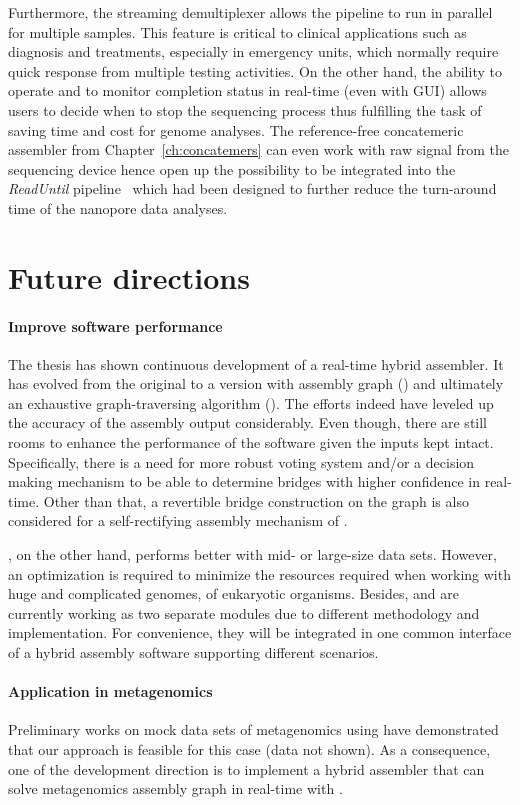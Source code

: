 Furthermore, the streaming demultiplexer \npbarcode{} allows the pipeline to run in parallel for multiple samples.
This feature is critical to clinical applications such as diagnosis and treatments, especially in emergency units, which normally require quick response from multiple testing activities.
On the other hand, the ability to operate and to monitor completion status in real-time (even with GUI) allows users to decide when to stop the sequencing process thus fulfilling the task of saving time and cost for genome analyses.
The reference-free concatemeric assembler from Chapter~\ref{ch:concatemers} can even work with raw signal from the sequencing device hence open up the possibility to be integrated into the \emph{ReadUntil} pipeline~\cite{LooseMS2016} which had been designed to further reduce the turn-around time of the nanopore data analyses.
\section{Future directions}
\paragraph{Improve software performance}
The thesis has shown continuous development of a real-time hybrid assembler. It has evolved from the original \npscarf{} to a version with assembly graph (\npscarfg{}) and ultimately an exhaustive graph-traversing algorithm (\npgraph{}). 
The efforts indeed have leveled up the accuracy of the assembly output considerably.
Even though, there are still rooms to enhance the performance of the software given the inputs kept intact.
Specifically, there is a need for more robust voting system and/or a decision making mechanism to be able to determine bridges with higher confidence in real-time.  
Other than that, a revertible bridge construction on the graph is also considered for a self-rectifying assembly mechanism of \npgraph{}. 

\npscarf{}, on the other hand, performs better with mid- or large-size data sets. However, an optimization is required to minimize the resources required when working with huge and complicated genomes, \EG{} of eukaryotic organisms.
Besides, \npscarf{} and \npgraph{} are currently working as two separate modules due to different methodology and implementation. For convenience, they will be integrated in one common interface of a hybrid assembly software supporting different scenarios.

\paragraph{Application in metagenomics}
Preliminary works on mock data sets of metagenomics using \npscarf{} have demonstrated that our approach is feasible for this case (data not shown).
As a consequence, one of the development direction is to implement a hybrid assembler that can solve metagenomics assembly graph in real-time with \npgraph{}.

